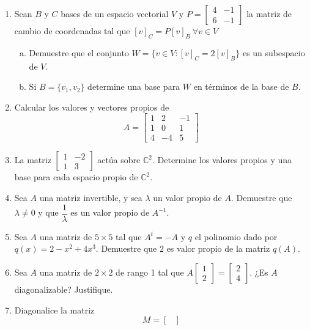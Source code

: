 \documentclass[12pt]{article}
\newenvironment{preguntas}
{\begin{enumerate}\itemsep12pt
	}
	{
	\end{enumerate}
}
\begin{document}
\begin{preguntas}
$$\begin{bmatrix}
	1 & 0 & -1\\
	1 & 1 & 0 \\
	0 & 1 & 2
	\end{bmatrix} [p]_{B_1} = [p]_{B_2}$$
	Determine los polinomios que forman la base $B_2$.
\item Sean $B$ y $C$ bases de un espacio vectorial $V$ y $P = \begin{bmatrix}4 &-1 \\ 6 & -1\end{bmatrix}$ la matriz de cambio de coordenadas tal que $[v]_C = P[v]_B\ \forall v \in V$
\begin{enumerate}[a)]
\item Demuestre que el conjunto $W = \{v \in V: [v]_C = 2[v]_B\}$ es un subespacio de $V$.
\item Si $B=\{v_1,v_2\}$ determine una base para $W$ en términos de la base de $B$.
\end{enumerate}
\item Calcular los valores y vectores propios de
	$$ A = \begin{bmatrix} 1 & 2 & -1\\ 1 & 0 & 1\\ 4 & -4 & 5\end{bmatrix}$$
\item La matriz $\begin{bmatrix} 1 & -2 \\ 1 & 3 \end{bmatrix}$ actúa sobre $\mathbb{C}^2$. Determine los valores propios y una base para cada espacio propio de $\mathbb{C}^2$.
\item Sea $A$ una matriz invertible, y sea $\lambda$ un valor propio de $A$. Demuestre que $\lambda \neq 0$ y que $\dfrac{1}{\lambda}$ es un valor propio de $A^{-1}$.
\item Sea $A$ una matriz de $5 \times 5$ tal que $A^t = -A$ y $q$ el polinomio dado por $q(x) = 2-x^2+4x^3$. Demuestre que $2$ es valor propio de la matriz $q(A)$.
\item Sea $A$ una matriz de $2\times 2$ de rango 1 tal que $A\begin{bmatrix} 1 \\ 2\end{bmatrix} = \begin{bmatrix} 2 \\ 4 \end{bmatrix}$. ¿Es $A$ diagonalizable? Justifique.
\item Diagonalice la matriz
	$$M = \begin{bmatrix}

\end{bmatrix}$$
\end{preguntas}
\end{document}
